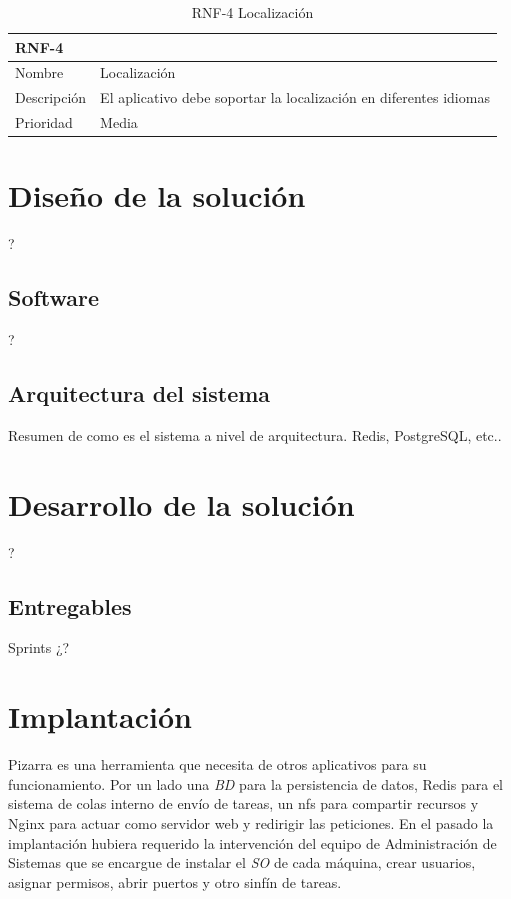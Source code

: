 \documentclass[11pt,spanish,listoffigures,listoftables]{tfgetsinf}
\begin{document}
\begin{table}
	\centering
	\begin{tabular}{ |p{4cm}||p{10cm}|  }
		\multicolumn{2}{l}{\textbf{RNF-4}} \\
		\hline
		Nombre   & Localización \\
		\hline
		Descripción  & El aplicativo debe soportar la localización en diferentes idiomas \\
		\hline
		Prioridad &  Media \\
		\hline
	\end{tabular}
	\caption{RNF-4 Localización}
	\label{table:27}
\end{table}



\chapter{Diseño de la solución}

?

\section{Software}

?

\section{Arquitectura del sistema}

Resumen de como es el sistema a nivel de arquitectura. Redis, PostgreSQL, etc..



\chapter{Desarrollo de la solución}

?

\section{Entregables}

Sprints ¿?

\chapter{Implantación}

Pizarra es una herramienta que necesita de otros aplicativos para su funcionamiento. Por un lado una \textit{BD} para la persistencia de datos, Redis para el sistema de colas interno de envío de tareas, un \acrshort{nfs} para compartir recursos y Nginx para actuar como servidor web y redirigir las peticiones. En el pasado la implantación hubiera requerido la intervención del equipo de Administración de Sistemas que se encargue de instalar el \textit{SO} de cada máquina, crear usuarios, asignar permisos, abrir puertos y otro sinfín de tareas.
\end{document}
